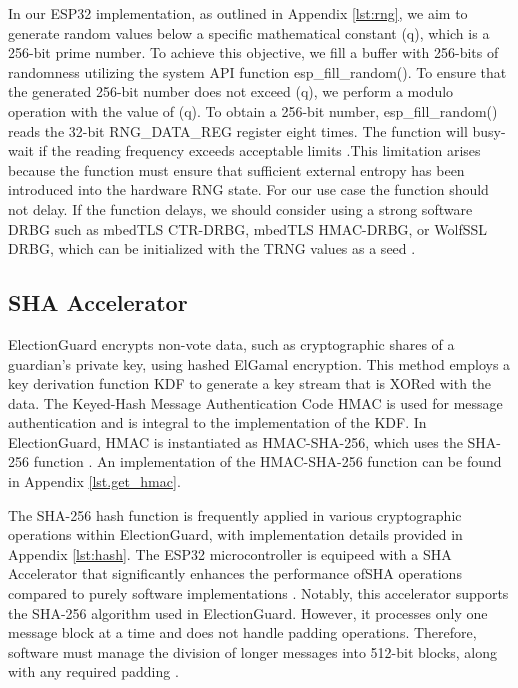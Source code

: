 In our ESP32 implementation, as outlined in Appendix \ref{lst:rng}, we aim to generate random values below a specific mathematical constant (q), which is a 256-bit prime number. To achieve this objective, we fill a buffer with 256-bits of randomness utilizing the system API function esp\_fill\_random(). To ensure that the generated 256-bit number does not exceed (q), we perform a modulo operation with the value of (q). To obtain a 256-bit number, esp\_fill\_random() reads the 32-bit RNG\_DATA\_REG register eight times. The function will busy-wait if the reading frequency exceeds acceptable limits \cite{esp32-ref}.This limitation arises because the function must ensure that sufficient external entropy has been introduced into the hardware RNG state. For our use case the function should not delay. If the function delays, we should consider using a strong software \ac{DRBG} such as mbedTLS CTR-DRBG, mbedTLS HMAC-DRBG, or WolfSSL DRBG, which can be initialized with the TRNG values as a seed \cite{esp32-ref} \cite[588]{wolfSSL-manual}.



\subsection{\ac{SHA} Accelerator}
ElectionGuard encrypts non-vote data, such as cryptographic shares of a guardian’s private key, using hashed ElGamal encryption. This method employs a key derivation function \ac{KDF} to generate a key stream that is XORed with the data. The Keyed-Hash Message Authentication Code \ac{HMAC} is used for message authentication and is integral to the implementation of the \ac{KDF}. In ElectionGuard, HMAC is instantiated as HMAC-SHA-256, which uses the SHA-256 function \cite[7]{eg-spec}. An implementation of the HMAC-SHA-256 function can be found in Appendix \ref{lst.get_hmac}. 

The SHA-256 hash function is frequently applied in various cryptographic operations within ElectionGuard, with implementation details provided in Appendix \ref{lst:hash}. The ESP32 microcontroller is equipeed with a \ac{SHA} Accelerator that significantly enhances the performance of\ac{SHA} operations compared to purely software implementations \cite[589]{esp32-ref}. Notably, this accelerator supports the SHA-256 algorithm used in ElectionGuard. However, it processes only one message block at a time and does not handle padding operations. Therefore, software must manage the division of longer messages into 512-bit blocks, along with any required padding \cite[2]{esp32-series}. 

